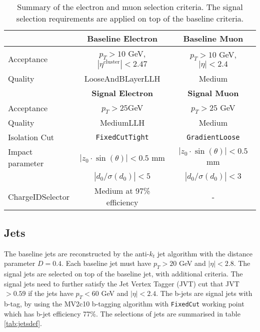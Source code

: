 \begin{table}[htbp]
\begin{center}
\begin{tabular}{|l|c|c|}
\hline
& \textbf{Baseline Electron} & \textbf{Baseline Muon} \\
\hline
\hline
Acceptance     & $p_T > 10$ GeV, $|\eta^{\text{cluster}}| < 2.47$  & $p_T > 10$ GeV, $|\eta| < 2.4$ \\
\hline
Quality & LooseAndBLayerLLH & Medium \\
\hline
\hline
& \textbf{Signal Electron} & \textbf{Signal Muon} \\
\hline
\hline
Acceptance & $p_T > 25$GeV & $p_T > 25$ GeV \\
\hline
Quality & MediumLLH & Medium \\
\hline
Isolation Cut  & \texttt{FixedCutTight} & \texttt{GradientLoose} \\
\hline
Impact parameter & $|z_0 \cdot \sin (\theta)|< 0.5$ mm   & $|z_0 \cdot \sin (\theta)|< 0.5$ mm \\
& $|d_0/\sigma(d_0)|<5$ & $|d_0/\sigma(d_0)| < 3$\\
\hline
ChargeIDSelector & Medium at 97\% efficiency & - \\
\hline
\end{tabular}
\end{center}
\caption{Summary of the electron and muon selection criteria. The signal selection requirements are applied on top of the baseline criteria.}
\label{tab:lepdef}
\end{table}

\subsection{Jets}
The baseline jets are reconstructed by the anti-$k_t$ jet algorithm with the distance parameter $D = 0.4$.
Each baseline jet must have $p_T > 20$ GeV and $|\eta| < 2.8$.
The signal jets are selected on top of the baseline jet, with additional criteria.
The signal jets need to further satisfy the Jet Vertex Tagger (JVT) cut that JVT$> 0.59$ if the jets have $p_T < 60$ GeV and $|\eta| < 2.4$.
The b-jets are signal jets with b-tag, by using the MV2c10 b-tagging algorithm with \texttt{FixedCut} working point which has b-jet efficiency 77\%.
The selections of jets are summarised in table \ref{tab:jetsdef}.

